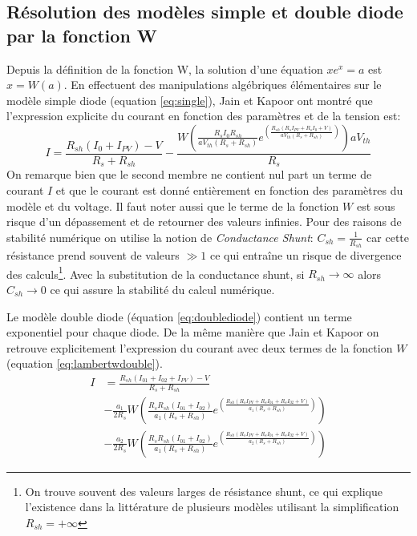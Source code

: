 \subsection{Résolution des modèles simple et double diode par la fonction W}
Depuis la définition de la fonction W, la solution d'une équation $xe^x = a$ est $x = W(a)$. En effectuent des manipulations algébriques élémentaires sur le modèle simple diode (equation \ref{eq:single}), Jain et Kapoor ont montré que l'expression explicite du courant en fonction des paramètres et de la tension est:
\begin{equation}
  \label{eq:lambertwsingle}
  I = \frac{R_{sh}(I_0 + I_{PV}) - V}{R_s + R_{sh}} - \frac{W\left(\frac{R_s I_0 R_{sh}}{a V_{th}(R_s + R_{sh})}e^{\left(\frac{R_{sh}(R_s I_{PV} + R_s I_0 + V)}{a V_{th} (R_s + R_{sh})}\right)}\right)aV_{th}}{R_s}
\end{equation}
On remarque bien que le second membre ne contient nul part un terme de courant $I$ et que le courant est donné entièrement en fonction des paramètres du modèle et du voltage. Il faut noter aussi que le terme de la fonction $W$ est sous risque d'un dépassement et de retourner des valeurs infinies. Pour des raisons de stabilité numérique on utilise la notion de \textit{Conductance Shunt}: $C_{sh} = \frac{1}{R_{sh}}$ car cette résistance prend souvent de valeurs $\gg 1$ ce qui entraîne un risque de divergence des calculs\footnote{On trouve souvent des valeurs larges de résistance shunt, ce qui explique l'existence dans la littérature de plusieurs modèles utilisant la simplification $R_{sh} = + \infty$}. Avec la substitution de la conductance shunt, si $R_{sh}\rightarrow\infty$ alors $C_{sh} \rightarrow 0$ ce qui assure la stabilité du calcul numérique.

Le modèle double diode (équation \ref{eq:doublediode}) contient un terme exponentiel pour chaque diode. De la même manière que Jain et Kapoor on retrouve explicitement l'expression du courant avec deux termes de la fonction $W$ (equation \ref{eq:lambertwdouble}).
\begin{equation}
  \label{eq:lambertwdouble}
  \begin{split}
    I &= \frac{R_{sh} (I_{01} + I_{02} + I_{PV}) - V}{R_s + R_{sh}}\\ 
    &- \frac{a_1}{2 R_s} W\left( \frac{R_s R_{sh}(I_{01} + I_{02})}{a_1 (R_s + R_{sh})}e^{\left(\frac{R_{sh}(R_s I_{PV} + R_s I_{01} + R_s I_{02} + V)}{a_1 (R_s + R_{sh})}\right)}\right)\\ 
    &- \frac{a_2}{2 R_s} W\left( \frac{R_s R_{sh}(I_{01} + I_{02})}{a_1 (R_s + R_{sh})}e^{\left(\frac{R_{sh}(R_s I_{PV} + R_s I_{01} + R_s I_{02} + V)}{a_2 (R_s + R_{sh})}\right)}\right)
  \end{split}
\end{equation}

